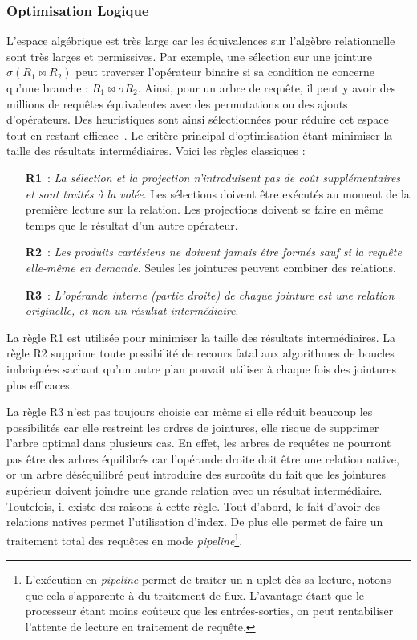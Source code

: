 \subsubsection{Optimisation Logique}
L'espace algébrique est très large car les équivalences sur l'algèbre relationnelle sont très larges et permissives. Par exemple, une sélection sur une jointure $\sigma (R_1 \Join R_2)$ peut traverser l'opérateur binaire si sa condition ne concerne qu'une branche : $R_1 \Join \sigma R_2$. Ainsi, pour un arbre de requête, il peut y avoir des millions de requêtes équivalentes avec des permutations ou des ajouts d'opérateurs. Des heuristiques sont ainsi sélectionnées pour réduire cet espace tout en restant efficace~\cite{Ioannidis:optimization}. Le critère principal d'optimisation étant minimiser la taille des résultats intermédiaires. Voici les règles classiques :
\begin{itemize}
    \item[\textbf{R1}~:] \textit{La sélection et la projection n'introduisent pas de coût supplémentaires et sont traités à la volée}. Les sélections doivent être exécutés au moment de la première lecture sur la relation. Les projections doivent se faire en même temps que le résultat d'un autre opérateur.
    \item[\textbf{R2}~:] \textit{Les produits cartésiens ne doivent jamais être formés sauf si la requête elle-même en demande}. Seules les jointures peuvent combiner des relations.
    \item[\textbf{R3}~:] \textit{L'opérande interne (partie droite) de chaque jointure est une relation originelle, et non un résultat intermédiaire}.
\end{itemize}

La règle R1 est utilisée pour minimiser la taille des résultats intermédiaires. La règle R2 supprime toute possibilité de recours fatal aux algorithmes de boucles imbriquées sachant qu'un autre plan pouvait utiliser à chaque fois des jointures plus efficaces.

La règle R3 n'est pas toujours choisie car même si elle réduit beaucoup les possibilités car elle restreint les ordres de jointures, elle risque de supprimer l'arbre optimal dans plusieurs cas. En effet, les arbres de requêtes ne pourront pas être des arbres équilibrés car l'opérande droite doit être une relation native, or un arbre déséquilibré peut introduire des surcoûts du fait que les jointures supérieur doivent joindre une grande relation avec un résultat intermédiaire. Toutefois, il existe des raisons à cette règle. Tout d'abord, le fait d'avoir des relations natives permet l'utilisation d'index. De plus elle permet de faire un traitement total des requêtes en mode \textit{pipeline}\footnote{L'exécution en \textit{pipeline} permet de traiter un n-uplet dès sa lecture, notons que cela s'apparente à du traitement de flux. L'avantage étant que le processeur étant moins coûteux que les entrées-sorties, on peut rentabiliser l'attente de lecture en traitement de requête.}.

